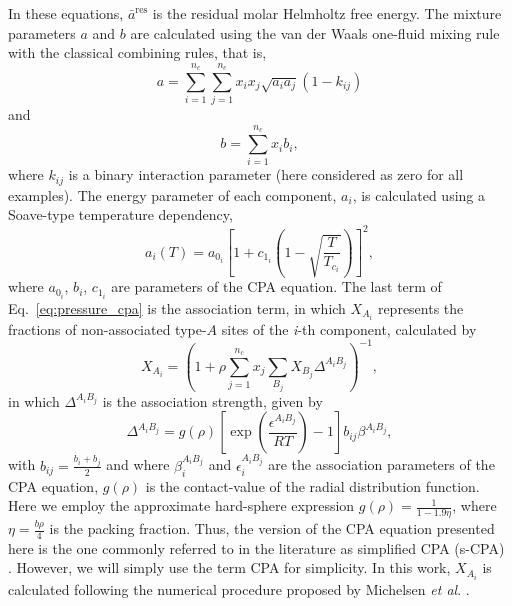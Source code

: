 \documentclass[preprint,12pt,3p]{elsarticle}
\begin{document}
In these equations, $\bar{a}^\text{res}$ is the residual molar Helmholtz free energy.
The mixture parameters $a$ and $b$ are calculated using the van der Waals one-fluid mixing rule with the classical combining rules, that is,
\begin{equation}
a = \sum_{i=1}^{n_c} \sum_{j=1}^{n_c} x_{i}x_{j}\sqrt{a_{i}a_{j}}(1-k_{ij})
\end{equation}
and
\begin{equation}
b = \sum_{i=1}^{n_c}x_{i}b_{i},
\end{equation}
where $k_{ij}$ is a binary interaction parameter (here considered as zero for all examples).
The energy parameter of each component, $a_{i}$, is calculated using a Soave-type temperature dependency,
\begin{equation}
a_{i}(T) = a_{0_{i}}\left[1+c_{1_{i}}\left(1-\sqrt{\frac{T}{T_{c_{i}}}}\right)\right]^2,
\end{equation}
where $a_{0_{i}}$, $b_{i}$, $c_{1_{i}}$ are parameters of the CPA equation.
The last term of Eq.~\ref{eq:pressure_cpa} is the association term, in which $X_{A_{i}}$ represents the fractions of non-associated type-$A$ sites of the \textit{i}-th component, calculated by
\begin{equation} \label{eq:frac_nb}
X_{A_{i}} = \left(1+\rho \sum_{j=1}^{n_c} x_{j} \sum_{B_{j}} X_{B_{j}} \Delta^{A_{i}B_{j}}\right)^{-1},
\end{equation}
in which $\Delta^{A_{i}B_{j}}$ is the association strength, given by
\begin{equation} \label{eq:delta_cpa}
\Delta^{A_{i}B_{j}} = g(\rho)\left[\exp\left(\frac{\epsilon^{A_{i}B_{j}}}{RT}\right)-1\right]b_{ij}\beta^{A_{i}B_{j}},
\end{equation}
with $b_{ij} = \frac{b_{i}+b_{j}}{2}$ and where $\beta_{i}^{A_{i}B_{j}}$ and $\epsilon_{i}^{A_{i}B_{j}}$ are the association parameters of the CPA equation, $g(\rho)$ is the contact-value of the radial distribution function. Here we employ the approximate hard-sphere expression $g(\rho) = \frac{1}{1-1.9\eta}$, where $\eta = \frac{b\rho}{4}$ is the packing fraction.
Thus, the version of the CPA equation presented here is the one commonly referred to in the literature as simplified CPA (s-CPA) \citep{kontogeorgis1999multicomponent}. However, we will simply use the term CPA for simplicity.
In this work, $X_{A_{i}}$ is calculated following the numerical procedure proposed by Michelsen \textit{et al}. \cite{michelsen2006robust}.
\end{document}

